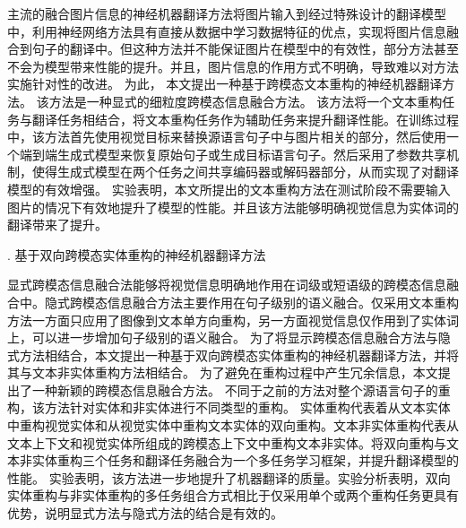 主流的融合图片信息的神经机器翻译方法将图片输入到经过特殊设计的翻译模型中，利用神经网络方法具有直接从数据中学习数据特征的优点，实现将图片信息融合到句子的翻译中。但这种方法并不能保证图片在模型中的有效性，部分方法甚至不会为模型带来性能的提升。并且，图片信息的作用方式不明确，导致难以对方法实施针对性的改进。
为此，%
本文提出一种基于跨模态文本重构的神经机器翻译方法。
该方法是一种显式的细粒度跨模态信息融合方法。%
该方法将一个文本重构任务与翻译任务相结合，将文本重构任务作为辅助任务来提升翻译性能。在训练过程中，该方法首先使用视觉目标来替换源语言句子中与图片相关的部分，然后使用一个端到端生成式模型来恢复原始句子或生成目标语言句子。然后采用了参数共享机制，使得生成式模型在两个任务之间共享编码器或解码器部分，从而实现了对翻译模型的有效增强。
实验表明，本文所提出的文本重构方法在测试阶段不需要输入图片的情况下有效地提升了模型的性能。并且该方法能够明确视觉信息为实体词的翻译带来了提升。

{. 基于双向跨模态实体重构的神经机器翻译方法}

显式跨模态信息融合法能够将视觉信息明确地作用在词级或短语级的跨模态信息融合中。隐式跨模态信息融合方法主要作用在句子级别的语义融合。仅采用文本重构方法一方面只应用了图像到文本单方向重构，另一方面视觉信息仅作用到了实体词上，可以进一步增加句子级别的语义融合。
为了将显示跨模态信息融合方法与隐式方法相结合，本文提出一种基于双向跨模态实体重构的神经机器翻译方法，并将其与文本非实体重构方法相结合。
为了避免在重构过程中产生冗余信息，本文提出了一种新颖的跨模态信息融合方法。
不同于之前的方法对整个源语言句子的重构，该方法针对实体和非实体进行不同类型的重构。
实体重构代表着从文本实体中重构视觉实体和从视觉实体中重构文本实体的双向重构。文本非实体重构代表从文本上下文和视觉实体所组成的跨模态上下文中重构文本非实体。将双向重构与文本非实体重构三个任务和翻译任务融合为一个多任务学习框架，并提升翻译模型的性能。
实验表明，该方法进一步地提升了机器翻译的质量。实验分析表明，双向实体重构与非实体重构的多任务组合方式相比于仅采用单个或两个重构任务更具有优势，说明显式方法与隐式方法的结合是有效的。

